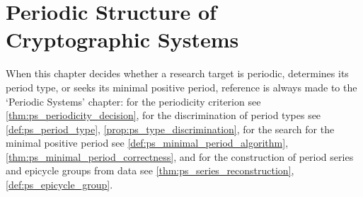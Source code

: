 \chapter{Periodic Structure of Cryptographic Systems}
\label{chap:crypto-periodic}

\begin{remark}\label{rem:crypto_ps_hook}
When this chapter decides whether a research target is periodic, determines its period type, or seeks its minimal positive period, reference is always made to the `Periodic Systems' chapter:
for the periodicity criterion see \cref{thm:ps_periodicity_decision},
for the discrimination of period types see \cref{def:ps_period_type}, \cref{prop:ps_type_discrimination},
for the search for the minimal positive period see \cref{def:ps_minimal_period_algorithm}, \cref{thm:ps_minimal_period_correctness},
and for the construction of period series and epicycle groups from data see \cref{thm:ps_series_reconstruction}, \cref{def:ps_epicycle_group}.
\end{remark}

